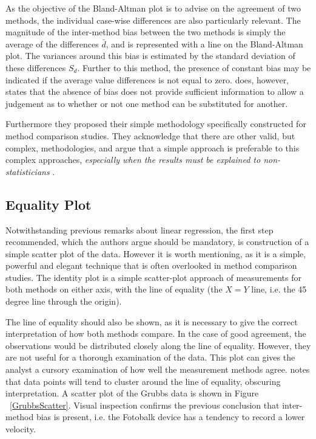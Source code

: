 \documentclass[12pt, a4paper]{report}
\theoremstyle{plain}
\theoremstyle{definition}
\theoremstyle{remark}
\begin{document}
	As the objective of the Bland-Altman plot is to advise on the agreement of two methods, the individual case-wise differences are also particularly relevant.	The magnitude of the inter-method bias between the two methods is simply the average of the differences $\bar{d}$, and is represented with a line on the Bland-Altman plot.  The variances around this bias is estimated by the standard deviation of these differences $S_{d}$. Further to this method, the presence of constant bias may be
	indicated if the average value differences is not equal to zero. \citet{BA86} does, however, states that the absence of bias does not provide sufficient information to allow a	judgement as to whether or not one method can be substituted for
	another.
	
Furthermore they proposed their simple methodology specifically constructed for method comparison studies. They acknowledge that there are other valid, but complex, methodologies, and argue that
		a simple approach is preferable to this complex approaches,
		\emph{especially when the results must be explained to
			non-statisticians} \citep*{BA83}.
		
		\subsection{Equality Plot}
Notwithstanding previous remarks about linear regression, the first step recommended, which the authors argue should be mandatory, is construction of a simple scatter plot of the data. However it is worth mentioning, as it is a simple, powerful and elegant technique that is often overlooked in method comparison studies. The identity plot is a simple scatter-plot approach of measurements for both methods on either axis, with the line of equality (the $X=Y$ line, i.e. the 45 degree line through the origin). 
			
The line of equality should also be shown, as it is necessary to give the correct interpretation of how both methods compare. In the case of good agreement, the observations would be distributed closely along the line of equality. However, they are not useful for a thorough examination of the data. This plot can gives the analyst a cursory examination of how well the measurement methods agree. \citet{BritHypSoc} notes that data points will tend to cluster around the line of equality, obscuring interpretation. A scatter plot of the Grubbs data is shown in Figure ~\ref{GrubbsScatter}. Visual inspection confirms the previous conclusion that inter-method bias is present, i.e. the Fotobalk device has a tendency to record a lower velocity.
	
\end{document}
